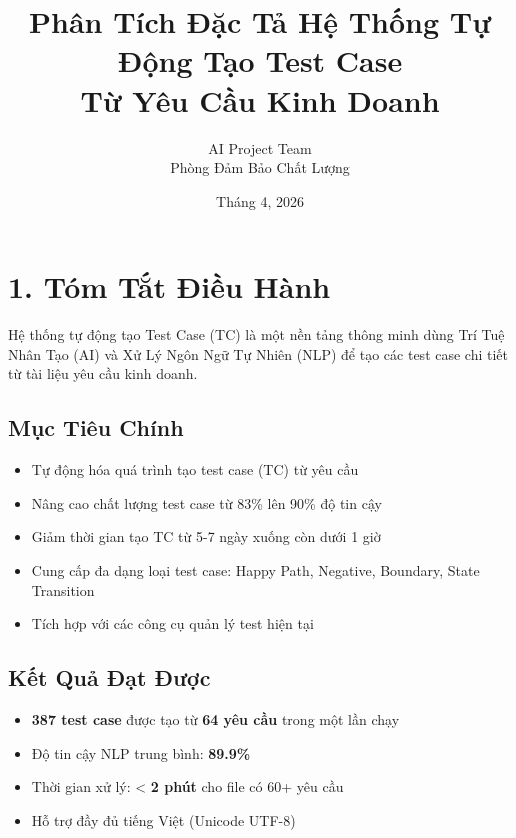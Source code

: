 \documentclass[14pt,a4paper]{article}
\title{\textbf{\LARGE Phân Tích Đặc Tả Hệ Thống Tự Động Tạo Test Case\\Từ Yêu Cầu Kinh Doanh}}
\author{AI Project Team\\Phòng Đảm Bảo Chất Lượng}
\date{Tháng 4, 2026}
\begin{document}
\maketitle
\newpage

\tableofcontents
\newpage

\section{1. Tóm Tắt Điều Hành}

Hệ thống tự động tạo Test Case (TC) là một nền tảng thông minh dùng Trí Tuệ Nhân Tạo (AI) 
và Xử Lý Ngôn Ngữ Tự Nhiên (NLP) để tạo các test case chi tiết từ tài liệu yêu cầu kinh doanh.

\subsection{Mục Tiêu Chính}
\begin{itemize}
    \item Tự động hóa quá trình tạo test case (TC) từ yêu cầu
    \item Nâng cao chất lượng test case từ 83\% lên 90\% độ tin cậy
    \item Giảm thời gian tạo TC từ 5-7 ngày xuống còn dưới 1 giờ
    \item Cung cấp đa dạng loại test case: Happy Path, Negative, Boundary, State Transition
    \item Tích hợp với các công cụ quản lý test hiện tại
\end{itemize}

\subsection{Kết Quả Đạt Được}
\begin{itemize}
    \item \textbf{387 test case} được tạo từ \textbf{64 yêu cầu} trong một lần chạy
    \item Độ tin cậy NLP trung bình: \textbf{89.9\%}
    \item Thời gian xử lý: < \textbf{2 phút} cho file có 60+ yêu cầu
    \item Hỗ trợ đầy đủ tiếng Việt (Unicode UTF-8)
\end{itemize}

\end{document}
